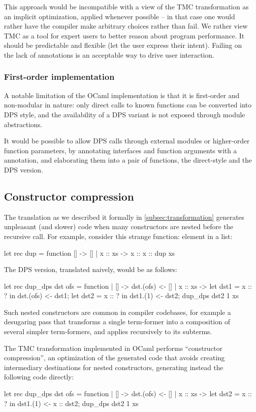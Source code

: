 This approach would be incompatible with a view of the TMC
transformation as an implicit optimization, applied whenever
possible -- in that case one would rather have the compiler make
arbitrary choices rather than fail. We rather view TMC as a tool for
expert users to better reason about program performance. It should be
predictable and flexible (let the user express
their intent). Failing on the lack of annotations is an acceptable way
to drive user interaction.

\subsubsection{First-order implementation} A notable limitation of the
OCaml implementation is that it is first-order and non-modular in
nature: only direct calls to known functions can be converted into DPS
style, and the availability of a DPS variant is not exposed through
module abstractions.

It would be possible to allow DPS calls through external modules or
higher-order function parameters, by annotating interfaces and
function arguments with a  annotation, and
elaborating them into a pair of functions, the direct-style and the DPS
version.

\subsection{Constructor compression} \label{subsec:constructor-compression} The translation as we described it formally in \cref{subsec:transformation} generates unpleasant (and slower) code when many constructors are nested before the recursive call. For example, consider this strange function: element in a list:
\begin{Ocaml}
let rec dup = function [] -> [] | x :: xs -> x :: x :: dup xs
\end{Ocaml}
The DPS version, translated naively, would be as follows:
\begin{Ocaml}
let rec dup_dps dst ofs = function
| [] -> dst.(ofs) <- []
| x :: xs ->
  let dst1 = x :: ? in
  dst.(ofs) <- dst1;
  let dst2 = x :: ? in
  dst1.(1) <- dst2;
  dup_dps dst2 1 xs
\end{Ocaml}
Such nested constructors are common in compiler codebases, for
example a desugaring pass that transforms a single term-former into
a composition of several simpler term-formers, and applies recursively to
its subterms.

The TMC transformation implemented in OCaml performs ``constructor compression'', an optimization of the generated code that avoids creating intermediary destinations for nested constructors, generating instead the following code directly:
\begin{Ocaml}
let rec dup_dps dst ofs = function
| [] -> dst.(ofs) <- []
| x :: xs ->
  let dst2 = x :: ? in
  dst1.(1) <- x :: dst2;
  dup_dps dst2 1 xs
\end{Ocaml}

